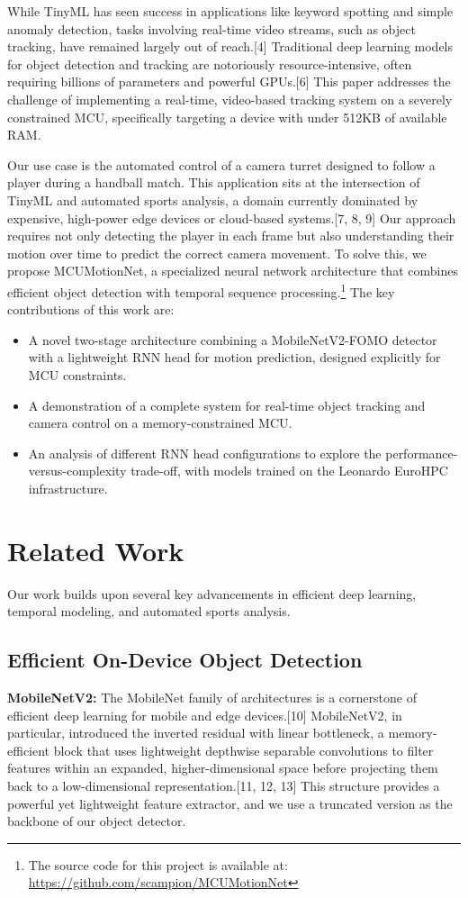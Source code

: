 \documentclass{article}
\begin{document}
While TinyML has seen success in applications like keyword spotting and simple anomaly detection, tasks involving real-time video streams, such as object tracking, have remained largely out of reach.[4] Traditional deep learning models for object detection and tracking are notoriously resource-intensive, often requiring billions of parameters and powerful GPUs.[6] This paper addresses the challenge of implementing a real-time, video-based tracking system on a severely constrained MCU, specifically targeting a device with under 512KB of available RAM.

Our use case is the automated control of a camera turret designed to follow a player during a handball match. This application sits at the intersection of TinyML and automated sports analysis, a domain currently dominated by expensive, high-power edge devices or cloud-based systems.[7, 8, 9] Our approach requires not only detecting the player in each frame but also understanding their motion over time to predict the correct camera movement. To solve this, we propose MCUMotionNet, a specialized neural network architecture that combines efficient object detection with temporal sequence processing.\footnote{The source code for this project is available at: \url{https://github.com/scampion/MCUMotionNet}} The key contributions of this work are:
\begin{itemize}
    \item A novel two-stage architecture combining a MobileNetV2-FOMO detector with a lightweight RNN head for motion prediction, designed explicitly for MCU constraints.
    \item A demonstration of a complete system for real-time object tracking and camera control on a memory-constrained MCU.
    \item An analysis of different RNN head configurations to explore the performance-versus-complexity trade-off, with models trained on the Leonardo EuroHPC infrastructure.
\end{itemize}

\section{Related Work}
Our work builds upon several key advancements in efficient deep learning, temporal modeling, and automated sports analysis.

\subsection{Efficient On-Device Object Detection}
\textbf{MobileNetV2:} The MobileNet family of architectures is a cornerstone of efficient deep learning for mobile and edge devices.[10] MobileNetV2, in particular, introduced the inverted residual with linear bottleneck, a memory-efficient block that uses lightweight depthwise separable convolutions to filter features within an expanded, higher-dimensional space before projecting them back to a low-dimensional representation.[11, 12, 13] This structure provides a powerful yet lightweight feature extractor, and we use a truncated version as the backbone of our object detector.
\end{document}
